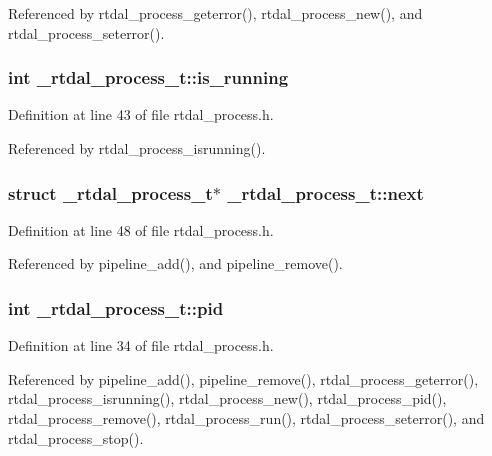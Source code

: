Referenced by rtdal\-\_\-process\-\_\-geterror(), rtdal\-\_\-process\-\_\-new(), and rtdal\-\_\-process\-\_\-seterror().

\subsubsection[{is\-\_\-running}]{\setlength{\rightskip}{0pt plus 5cm}int \-\_\-rtdal\-\_\-process\-\_\-t\-::is\-\_\-running}\label{struct__rtdal__process__t_a352c3d3dbdc8bec9b6177ab1fd0dddc2}


Definition at line 43 of file rtdal\-\_\-process.\-h.



Referenced by rtdal\-\_\-process\-\_\-isrunning().

\subsubsection[{next}]{\setlength{\rightskip}{0pt plus 5cm}struct {\bf \-\_\-rtdal\-\_\-process\-\_\-t}$\ast$ \-\_\-rtdal\-\_\-process\-\_\-t\-::next}\label{struct__rtdal__process__t_a623279364fe34c5d8743b2e73124a070}


Definition at line 48 of file rtdal\-\_\-process.\-h.



Referenced by pipeline\-\_\-add(), and pipeline\-\_\-remove().

\subsubsection[{pid}]{\setlength{\rightskip}{0pt plus 5cm}int \-\_\-rtdal\-\_\-process\-\_\-t\-::pid}\label{struct__rtdal__process__t_a7826a585e78280654a2cf5e2c07d318e}


Definition at line 34 of file rtdal\-\_\-process.\-h.



Referenced by pipeline\-\_\-add(), pipeline\-\_\-remove(), rtdal\-\_\-process\-\_\-geterror(), rtdal\-\_\-process\-\_\-isrunning(), rtdal\-\_\-process\-\_\-new(), rtdal\-\_\-process\-\_\-pid(), rtdal\-\_\-process\-\_\-remove(), rtdal\-\_\-process\-\_\-run(), rtdal\-\_\-process\-\_\-seterror(), and rtdal\-\_\-process\-\_\-stop().

